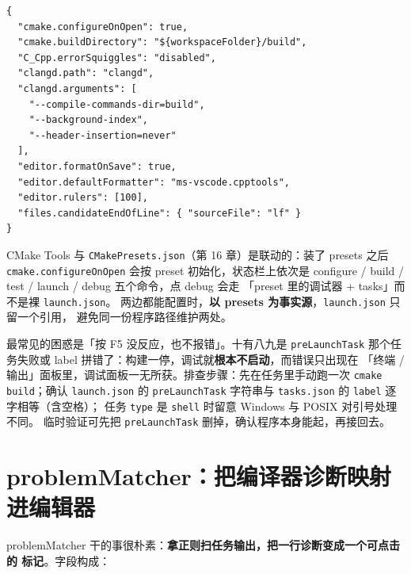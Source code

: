 \documentclass[12pt,a4paper,fontset=fandol]{ctexbook}
\begin{document}
\begin{lstlisting}[style=jsonstyle,caption={.vscode/settings.json：把保存动作与 CMake Tools 固定下来},label={lst:ch07-settings}]
{
  "cmake.configureOnOpen": true,
  "cmake.buildDirectory": "${workspaceFolder}/build",
  "C_Cpp.errorSquiggles": "disabled",
  "clangd.path": "clangd",
  "clangd.arguments": [
    "--compile-commands-dir=build",
    "--background-index",
    "--header-insertion=never"
  ],
  "editor.formatOnSave": true,
  "editor.defaultFormatter": "ms-vscode.cpptools",
  "editor.rulers": [100],
  "files.candidateEndOfLine": { "sourceFile": "lf" }
}
\end{lstlisting}

CMake Tools 与 \texttt{CMakePresets.json}（第 16 章）是联动的：装了 presets 之后
\texttt{cmake.configureOnOpen} 会按 preset 初始化，状态栏上依次是
configure / build / test / launch / debug 五个命令，点 debug 会走
「preset 里的调试器 + tasks」而不是裸 \texttt{launch.json}。
两边都能配置时，\textbf{以 presets 为事实源}，\texttt{launch.json} 只留一个引用，
避免同一份程序路径维护两处。

\begin{warning}[title={preLaunchTask 失败时调试器静默不启动}]
最常见的困惑是「按 F5 没反应，也不报错」。十有八九是 \texttt{preLaunchTask}
那个任务失败或 label 拼错了：构建一停，调试就\textbf{根本不启动}，而错误只出现在
「终端 / 输出」面板里，调试面板一无所获。排查步骤：先在任务里手动跑一次
\texttt{cmake build}；确认 \texttt{launch.json} 的 \texttt{preLaunchTask}
字符串与 \texttt{tasks.json} 的 \texttt{label} 逐字相等（含空格）；
任务 \texttt{type} 是 \texttt{shell} 时留意 Windows 与 POSIX 对引号处理不同。
临时验证可先把 \texttt{preLaunchTask} 删掉，确认程序本身能起，再接回去。
\end{warning}

\section{problemMatcher：把编译器诊断映射进编辑器}\label{sec:ch07-s4}

problemMatcher 干的事很朴素：\textbf{拿正则扫任务输出，把一行诊断变成一个可点击的
标记}。字段构成：
\end{document}
